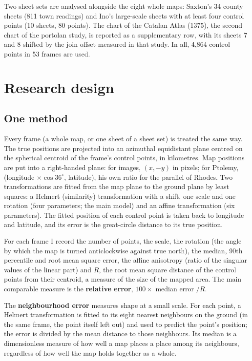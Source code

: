 \documentclass[11pt,a4paper]{article}
\begin{document}
Two sheet sets are analysed alongside the eight whole maps: Saxton's 34 county sheets (811 town readings) and Ino's large-scale sheets with at least four control points (10 sheets, 80 points). The chart of the Catalan Atlas (1375), the second chart of the portolan study, is reported as a supplementary row, with its sheets 7 and 8 shifted by the join offset measured in that study. In all, 4,864 control points in 53 frames are used.

\section{Research design}\label{sec:design}
\subsection{One method}
Every frame (a whole map, or one sheet of a sheet set) is treated the same way. The true positions are projected into an azimuthal equidistant plane centred on the spherical centroid of the frame's control points, in kilometres. Map positions are put into a right-handed plane: for images, $(x, -y)$ in pixels; for Ptolemy, (longitude $\times \cos 36^\circ$, latitude), his own ratio for the parallel of Rhodes. Two transformations are fitted from the map plane to the ground plane by least squares: a Helmert (similarity) transformation with a shift, one scale and one rotation (four parameters; the main model) and an affine transformation (six parameters). The fitted position of each control point is taken back to longitude and latitude, and its error is the great-circle distance to its true position.

For each frame I record the number of points, the scale, the rotation (the angle by which the map is turned anticlockwise against true north), the median, 90th percentile and root mean square error, the affine anisotropy (ratio of the singular values of the linear part) and $R$, the root mean square distance of the control points from their centroid, a measure of the size of the mapped area. The main comparable measure is the \textbf{relative error}, $100 \times$ median error $/ R$.

The \textbf{neighbourhood error} measures shape at a small scale. For each point, a Helmert transformation is fitted to its eight nearest neighbours on the ground (in the same frame, the point itself left out) and used to predict the point's position; the error is divided by the mean distance to those neighbours. Its median is a dimensionless measure of how well a map places a place among its neighbours, regardless of how well the map holds together as a whole.
\end{document}
